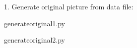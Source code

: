 \begin{appendices}
    
    1. Generate original picture from data file:

    generateoriginal1.py

    

    generateoriginal2.py

    
    
\end{appendices}